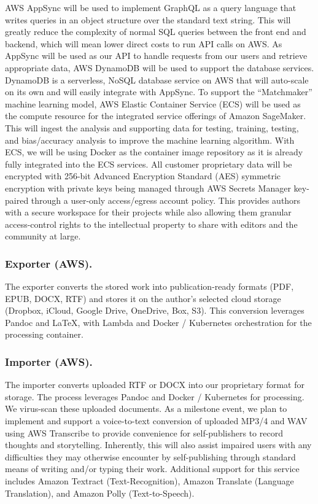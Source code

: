\documentclass[10pt,openany]{book}
\begin{document}
AWS AppSync will be used to implement GraphQL as a query language that
writes queries in an object structure over the standard text string.
This will greatly reduce the complexity of normal SQL queries between
the front end and backend, which will mean lower direct costs to run API
calls on AWS. As AppSync will be used as our API to handle requests from
our users and retrieve appropriate data, AWS DynamoDB will be used to
support the database services. DynamoDB is a serverless, NoSQL database
service on AWS that will auto-scale on its own and will easily integrate
with AppSync. To support the ``Matchmaker'' machine learning model, AWS
Elastic Container Service (ECS) will be used as the compute resource for
the integrated service offerings of Amazon SageMaker. This will ingest
the analysis and supporting data for testing, training, testing, and
bias/accuracy analysis to improve the machine learning algorithm. With
ECS, we will be using Docker as the container image repository as it is
already fully integrated into the ECS services. All customer proprietary
data will be encrypted with 256-bit Advanced Encryption Standard (AES)
symmetric encryption with private keys being managed through AWS Secrets
Manager key-paired through a user-only access/egress account policy.
This provides authors with a secure workspace for their projects while
also allowing them granular access-control rights to the intellectual
property to share with editors and the community at large.

\hypertarget{exporter-aws.}{%
\subsubsection{Exporter (AWS).}\label{exporter-aws.}}

The exporter converts the stored work into publication-ready formats
(PDF, EPUB, DOCX, RTF) and stores it on the author's selected cloud
storage (Dropbox, iCloud, Google Drive, OneDrive, Box, S3). This
conversion leverages Pandoc and LaTeX, with Lambda and Docker /
Kubernetes orchestration for the processing container.

\hypertarget{importer-aws.}{%
\subsubsection{Importer (AWS).}\label{importer-aws.}}

The importer converts uploaded RTF or DOCX into our proprietary format
for storage. The process leverages Pandoc and Docker / Kubernetes for
processing. We virus-scan these uploaded documents. As a milestone
event, we plan to implement and support a voice-to-text conversion of
uploaded MP3/4 and WAV using AWS Transcribe to provide convenience for
self-publishers to record thoughts and storytelling. Inherently, this
will also assist impaired users with any difficulties they may otherwise
encounter by self-publishing through standard means of writing and/or
typing their work. Additional support for this service includes Amazon
Textract (Text-Recognition), Amazon Translate (Language Translation),
and Amazon Polly (Text-to-Speech).
\end{document}
